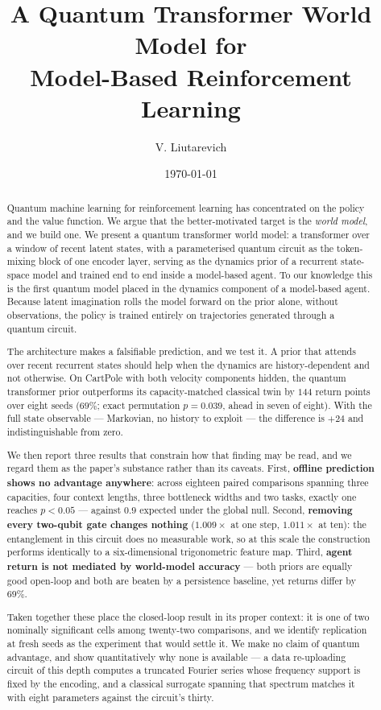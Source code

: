 \documentclass[11pt,onecolumn]{article}
\title{\bfseries A Quantum Transformer World Model for\\
       Model-Based Reinforcement Learning}
\author{V. Liutarevich
        \affiliation{\pend{affiliation}}
        \email{\pend{contact email}}}
\date{\today}
\newcommand{\maketitlefallback}{\maketitle}
\begin{document}
\maketitlefallback

\begin{abstract}
\noindent
Quantum machine learning for reinforcement learning has concentrated on
the policy and the value function. We argue that the better-motivated
target is the \emph{world model}, and we build one. We present a quantum
transformer world model: a transformer over a window of recent latent
states, with a parameterised quantum circuit as the token-mixing block
of one encoder layer, serving as the dynamics prior of a recurrent
state-space model and trained end to end inside a model-based agent. To
our knowledge this is the first quantum model placed in the dynamics
component of a model-based agent. Because latent imagination rolls the
model forward on the prior alone, without observations, the policy is
trained entirely on trajectories generated through a quantum circuit.

The architecture makes a falsifiable prediction, and we test it. A prior
that attends over recent recurrent states should help when the dynamics
are history-dependent and not otherwise. On CartPole with both velocity
components hidden, the quantum transformer prior outperforms its
capacity-matched classical twin by $144$ return points over eight seeds
($69\%$; exact permutation $p = 0.039$, ahead in seven of eight). With
the full state observable --- Markovian, no history to exploit --- the
difference is $+24$ and indistinguishable from zero.

We then report three results that constrain how that finding may be
read, and we regard them as the paper's substance rather than its
caveats. First, \textbf{offline prediction shows no advantage
anywhere}: across eighteen paired comparisons spanning three capacities,
four context lengths, three bottleneck widths and two tasks, exactly one
reaches $p < 0.05$ --- against $0.9$ expected under the global null.
Second, \textbf{removing every two-qubit gate changes nothing}
($1.009\times$ at one step, $1.011\times$ at ten): the entanglement in
this circuit does no measurable work, so at this scale the construction
performs identically to a six-dimensional trigonometric feature map.
Third, \textbf{agent return is not mediated by world-model accuracy} ---
both priors are equally good open-loop and both are beaten by a
persistence baseline, yet returns differ by $69\%$.

Taken together these place the closed-loop result in its proper context:
it is one of two nominally significant cells among twenty-two
comparisons, and we identify replication at fresh seeds as the
experiment that would settle it. We make no claim of quantum advantage,
and show quantitatively why none is available --- a data re-uploading
circuit of this depth computes a truncated Fourier series whose
frequency support is fixed by the encoding, and a classical surrogate
spanning that spectrum matches it with eight parameters against the
circuit's thirty.


\end{abstract}
\end{document}

